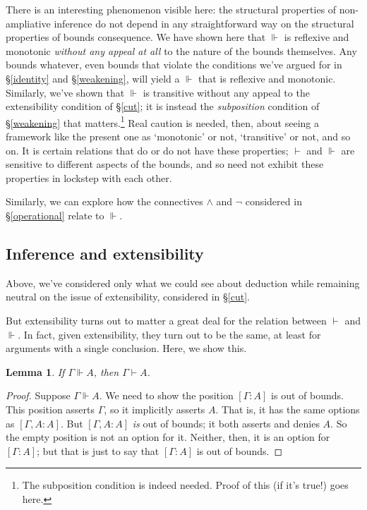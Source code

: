 \documentclass{article}
\newcommand{\G}{\ensuremath{\Gamma}}
\newcommand{\pos}[2]{\ensuremath{[#1:#2]}}
\newcommand{\cns}{\vdash}
\newcommand{\ded}{\Vdash}
\newtheorem{lem}{Lemma}
\begin{document}
There is an interesting phenomenon visible here: the structural properties of non-ampliative inference do not depend in any straightforward way on the structural properties of bounds consequence.
We have shown here that $\ded$ is reflexive and monotonic {\em without any appeal at all} to the nature of the bounds themselves.
Any bounds whatever, even bounds that violate the conditions we've argued for in \S\ref{identity} and \S\ref{weakening}, will yield a $\ded$ that is reflexive and monotonic.
Similarly, we've shown that $\ded$ is transitive without any appeal to the extensibility condition of \S\ref{cut}; it is instead the {\em subposition} condition of \S\ref{weakening} that matters.\footnote{The subposition condition is indeed needed. Proof of this (if it's true!) goes here.}
Real caution is needed, then, about seeing a framework like the present one as `monotonic' or not, `transitive' or not, and so on. 
It is certain relations that do or do not have these properties; $\cns$ and $\ded$ are sensitive to different aspects of the bounds, and so need not exhibit these properties in lockstep with each other.

Similarly, we can explore how the connectives $\wedge$ and $\neg$ considered in \S\ref{operational} relate to $\ded$.


\subsection{Inference and extensibility}

Above, we've considered only what we could see about deduction while remaining neutral on the issue of extensibility, considered in \S\ref{cut}.

But extensibility turns out to matter a great deal for the relation between $\cns$ and $\ded$.
In fact, given extensibility, they turn out to be the same, at least for arguments with a single conclusion. 
Here, we show this.

\begin{lem}
If $\G \ded A$, then $\G \cns A$.
\end{lem}

\begin{proof}
Suppose $\G \ded A$. 
We need to show the position $\pos{\G}{A}$ is out of bounds.
This position asserts $\G$, so it implicitly asserts $A$. 
That is, it has the same options as $\pos{\G, A}{A}$.
But $\pos{\G, A}{A}$ {\em is} out of bounds; it both asserts and denies $A$.
So the empty position is not an option for it.
Neither, then, it is an option for $\pos{\G}{A}$; but that is just to say that $\pos{\G}{A}$ is out of bounds.
\end{proof}
\end{document}
